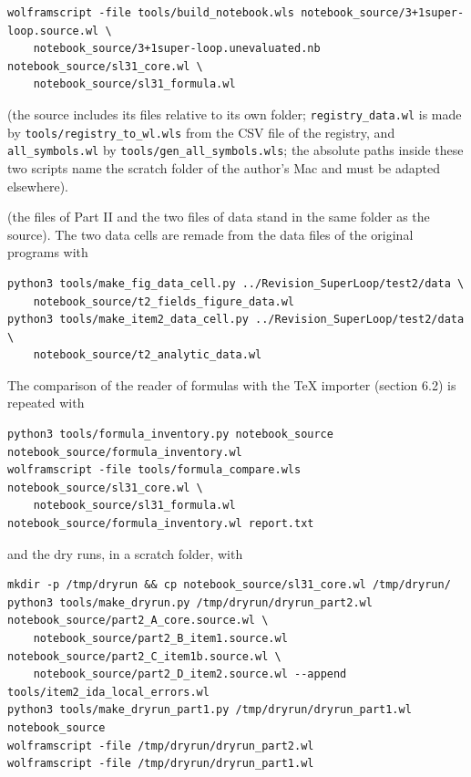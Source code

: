 \documentclass[
  10pt,
]{article}
\begin{document}
\begin{verbatim}
wolframscript -file tools/build_notebook.wls notebook_source/3+1super-loop.source.wl \
    notebook_source/3+1super-loop.unevaluated.nb notebook_source/sl31_core.wl \
    notebook_source/sl31_formula.wl
\end{verbatim}

(the source includes its files relative to its own folder;
\texttt{registry\_data.wl} is made by
\texttt{tools/registry\_to\_wl.wls} from the CSV file of the registry,
and \texttt{all\_symbols.wl} by \texttt{tools/gen\_all\_symbols.wls};
the absolute paths inside these two scripts name the scratch folder of
the author's Mac and must be adapted elsewhere).

(the files of Part II and the two files of data stand in the same folder
as the source). The two data cells are remade from the data files of the
original programs with

\begin{verbatim}
python3 tools/make_fig_data_cell.py ../Revision_SuperLoop/test2/data \
    notebook_source/t2_fields_figure_data.wl
python3 tools/make_item2_data_cell.py ../Revision_SuperLoop/test2/data \
    notebook_source/t2_analytic_data.wl
\end{verbatim}

The comparison of the reader of formulas with the TeX importer (section
6.2) is repeated with

\begin{verbatim}
python3 tools/formula_inventory.py notebook_source notebook_source/formula_inventory.wl
wolframscript -file tools/formula_compare.wls notebook_source/sl31_core.wl \
    notebook_source/sl31_formula.wl notebook_source/formula_inventory.wl report.txt
\end{verbatim}

and the dry runs, in a scratch folder, with

\begin{verbatim}
mkdir -p /tmp/dryrun && cp notebook_source/sl31_core.wl /tmp/dryrun/
python3 tools/make_dryrun.py /tmp/dryrun/dryrun_part2.wl notebook_source/part2_A_core.source.wl \
    notebook_source/part2_B_item1.source.wl notebook_source/part2_C_item1b.source.wl \
    notebook_source/part2_D_item2.source.wl --append tools/item2_ida_local_errors.wl
python3 tools/make_dryrun_part1.py /tmp/dryrun/dryrun_part1.wl notebook_source
wolframscript -file /tmp/dryrun/dryrun_part2.wl
wolframscript -file /tmp/dryrun/dryrun_part1.wl
\end{verbatim}
\end{document}
